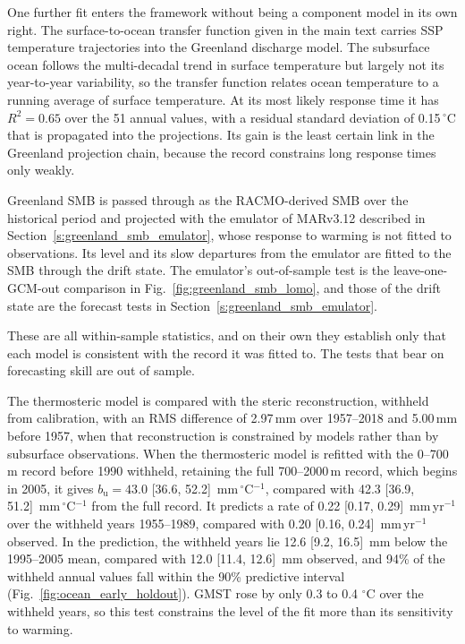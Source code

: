 \documentclass[12pt]{article}
\begin{document}
One further fit enters the framework without being a component model in its own right. The surface-to-ocean transfer function given in the main text carries SSP temperature trajectories into the Greenland discharge model. The subsurface ocean follows the multi-decadal trend in surface temperature but largely not its year-to-year variability, so the transfer function relates ocean temperature to a running average of surface temperature. At its most likely response time it has $R^2 = 0.65$ over the 51 annual values, with a residual standard deviation of 0.15\,$^\circ$C that is propagated into the projections. Its gain is the least certain link in the Greenland projection chain, because the record constrains long response times only weakly.

Greenland SMB is passed through as the RACMO-derived \citet{Mouginot2019} SMB over the historical period and projected with the emulator of MARv3.12 described in Section~\ref{s:greenland_smb_emulator}, whose response to warming is not fitted to observations. Its level and its slow departures from the emulator are fitted to the \citet{Mouginot2019} SMB through the drift state. The emulator's out-of-sample test is the leave-one-GCM-out comparison in Fig.~\ref{fig:greenland_smb_lomo}, and those of the drift state are the forecast tests in Section~\ref{s:greenland_smb_emulator}.

These are all within-sample statistics, and on their own they establish only that each model is consistent with the record it was fitted to. The tests that bear on forecasting skill are out of sample.

The thermosteric model is compared with the \citet{Frederikse2020} steric reconstruction, withheld from calibration, with an RMS difference of 2.97\,mm over 1957--2018 and 5.00\,mm before 1957, when that reconstruction is constrained by models rather than by subsurface observations. When the thermosteric model is refitted with the 0--700\,m record before 1990 withheld, retaining the full 700--2000\,m record, which begins in 2005, it gives $b_{\mathrm{u}} = 43.0$ [36.6, 52.2]~mm\,$^\circ$C$^{-1}$, compared with 42.3 [36.9, 51.2]~mm\,$^\circ$C$^{-1}$ from the full record. It predicts a rate of 0.22 [0.17, 0.29]~mm\,yr$^{-1}$ over the withheld years 1955--1989, compared with 0.20 [0.16, 0.24]~mm\,yr$^{-1}$ observed. In the prediction, the withheld years lie 12.6 [9.2, 16.5]~mm below the 1995--2005 mean, compared with 12.0 [11.4, 12.6]~mm observed, and 94\% of the withheld annual values fall within the 90\% predictive interval (Fig.~\ref{fig:ocean_early_holdout}). GMST rose by only 0.3 to 0.4 $^\circ$C over the withheld years, so this test constrains the level of the fit more than its sensitivity to warming.
\end{document}
